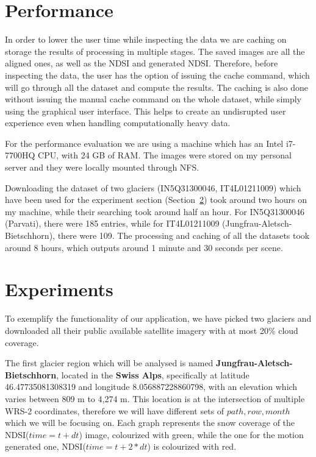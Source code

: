\documentclass[12pt, a4paper]{report}
\begin{document}
	
	\section{Performance}
	\label{seq:performance}
	
	\par In order to lower the user time while inspecting the data we are caching on storage the results of processing in multiple stages. The saved images are all the aligned ones, as well as the NDSI and generated NDSI. Therefore, before inspecting the data, the user has the option of issuing the cache command, which will go through all the dataset and compute the results. The caching is also done without issuing the manual cache command on the whole dataset, while simply using the graphical user interface. This helps to create an undisrupted user experience even when handling computationally heavy data.
	
	For the performance evaluation we are using a machine which has an Intel i7-7700HQ CPU, with 24 GB of RAM. The images were stored on my personal server and they were locally mounted through NFS.
	
	Downloading the dataset of two glaciers (IN5Q31300046, IT4L01211009) which have been used for the experiment section (Section~\ref{seq:experiments}) took around two hours on my machine, while their searching took around half an hour. For IN5Q31300046 (Parvati), there were 185 entries, while for IT4L01211009 (Jungfrau-Aletsch-Bietschhorn), there were 109. The processing and caching of all the datasets took around 8 hours, which outputs around 1 minute and 30 seconds per scene.
	
	\section{Experiments}
	\label{seq:experiments}
	
	\par To exemplify the functionality of our application, we have picked two glaciers and downloaded all their public available satellite imagery with at most 20\% cloud coverage. 
	
	\par The first glacier region which will be analysed is named \textbf{Jungfrau-Aletsch-Bietschhorn}, located in the \textbf{Swiss Alps}, specifically at latitude 46.47735081308319 and longitude 8.056887228860798, with an elevation which varies between 809 m to 4,274 m. This location is at the intersection of multiple WRS-2 coordinates, therefore we will have different sets of \(path, row, month\) which we will be focusing on. Each graph represents the snow coverage of the NDSI(\(time = t + dt\)) image, colourized with green, while the one for the motion generated one, NDSI(\(time = t + 2*dt\)) is colourized with red.
	
\end{document}
